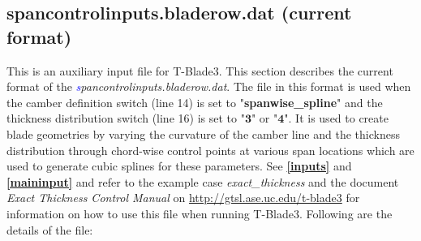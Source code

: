 \documentclass[8pt]{article}
\begin{document}
\subsection{spancontrolinputs.bladerow.dat (current format)}\label{auxinput}
\noindent
This is an auxiliary input file for T-Blade3. This section describes the current format of the \textit{\textcolor{blue}spancontrolinputs.bladerow.dat}. The file in this format is used when the camber definition switch (line 14) is set to "\textbf{spanwise\_spline}" and the thickness distribution switch (line 16) is set to "$\mathbf{3}$" or "$\mathbf{4}$". It is used to create blade geometries by varying the curvature of the camber line and the thickness distribution through chord-wise control points at various span locations which are used to generate cubic splines for these parameters. See \textbf{\ref{inputs}} and \textbf{\ref{maininput}} and refer to the example case \textit{exact\_thickness} and the document \textit{Exact Thickness Control Manual} on \url{http://gtsl.ase.uc.edu/t-blade3} for information on how to use this file when running T-Blade3. Following are the details of the file:
\end{document}
